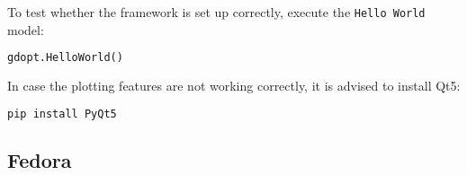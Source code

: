 \documentclass[12pt]{article}
\begin{document}
\begin{mdframed}[backgroundcolor=gray!10, roundcorner=10pt,
		linewidth=1pt]
To test whether the framework is set up correctly, execute the \texttt{Hello World} model:
\begin{lstlisting}[language=python]
gdopt.HelloWorld()
\end{lstlisting}

In case the plotting features are not working correctly, it is advised to install Qt5:

\begin{lstlisting}[language=bash]
pip install PyQt5
\end{lstlisting}

\end{mdframed}

\newpage

\subsection{Fedora}
\end{document}
